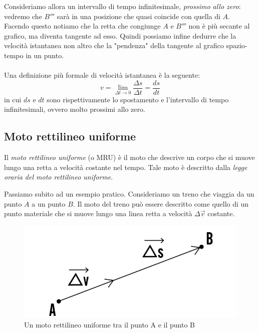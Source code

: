 \documentclass[11pt]{article}
\begin{document}
Consideriamo allora un intervallo di tempo infinitesimale, \textit{prossimo allo zero}: vedremo che $B'''$ sarà in una posizione che quasi coincide con quella di $A$. Facendo questo notiamo che la retta che congiunge $A$ e $B'''$ non è più secante al grafico, ma diventa tangente ad esso. Quindi possiamo infine dedurre che la velocità istantanea non altro che la "pendenza" della tangente al grafico spazio-tempo in un punto.
\\ \\ 
Una definizione più formale di velocità istantanea è la seguente:
\begin{equation}
v = \lim_{\Delta t \to 0} \dfrac{\Delta s}{\Delta t} = \dfrac{ds}{dt}
\end{equation}
in cui $ds$ e $dt$ sono rispettivamente lo spostamento e l'intervallo di tempo infinitesimali, ovvero molto prossimi allo zero.

\subsection{Moto rettilineo uniforme}
Il\textit{ moto rettilineo uniforme} (o MRU) è il moto che descrive un corpo che si muove lungo una retta a velocità costante nel tempo. Tale moto è descritto dalla \textit{legge oraria del moto rettilineo uniforme}.

Passiamo subito ad un esempio pratico. Consideriamo un treno che viaggia da un punto $A$ a un punto $B$. Il moto del treno può essere descritto come quello di un punto materiale che si muove lungo una linea retta a velocità $\Delta \overrightarrow{v}$ costante.

\begin{figure}[H]
\label{motoRettilineoUniformeA-B}

\includegraphics[scale=0.7]{moto_ret_unif.png}
\caption{Un moto rettilineo uniforme tra il punto A e il punto B}
\centering
\end{figure}
\end{document}
